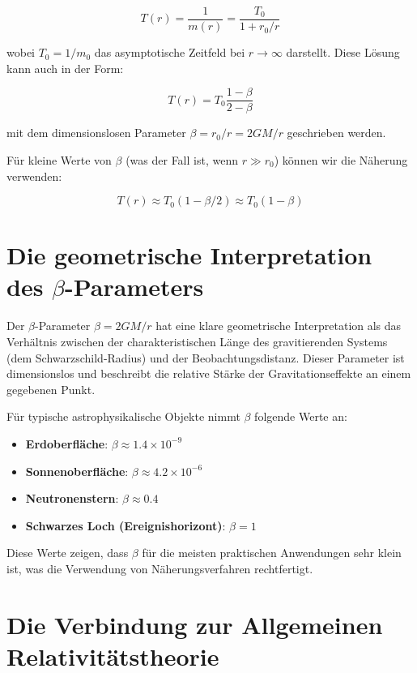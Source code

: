 \documentclass[12pt,a4paper]{report}
\begin{document}
	\begin{equation}
		T(r) = \frac{1}{m(r)} = \frac{T_0}{1 + r_0/r}
	\end{equation}
	
	wobei $T_0 = 1/m_0$ das asymptotische Zeitfeld bei $r \to \infty$ darstellt. Diese Lösung kann auch in der Form:
	
	\begin{equation}
		T(r) = T_0\frac{1 - \beta}{2 - \beta}
	\end{equation}
	
	mit dem dimensionslosen Parameter $\beta = r_0/r = 2GM/r$ geschrieben werden.
	
	Für kleine Werte von $\beta$ (was der Fall ist, wenn $r \gg r_0$) können wir die Näherung verwenden:
	
	\begin{equation}
		T(r) \approx T_0(1 - \beta/2) \approx T_0(1 - \beta)
	\end{equation}
	
	\section{Die geometrische Interpretation des $\beta$-Parameters}
	
	Der $\beta$-Parameter $\beta = 2GM/r$ hat eine klare geometrische Interpretation als das Verhältnis zwischen der charakteristischen Länge des gravitierenden Systems (dem Schwarzschild-Radius) und der Beobachtungsdistanz. Dieser Parameter ist dimensionslos und beschreibt die relative Stärke der Gravitationseffekte an einem gegebenen Punkt.
	
	Für typische astrophysikalische Objekte nimmt $\beta$ folgende Werte an:
	
	\begin{itemize}
		\item \textbf{Erdoberfläche}: $\beta \approx 1.4 \times 10^{-9}$
		\item \textbf{Sonnenoberfläche}: $\beta \approx 4.2 \times 10^{-6}$
		\item \textbf{Neutronenstern}: $\beta \approx 0.4$
		\item \textbf{Schwarzes Loch (Ereignishorizont)}: $\beta = 1$
	\end{itemize}
	
	Diese Werte zeigen, dass $\beta$ für die meisten praktischen Anwendungen sehr klein ist, was die Verwendung von Näherungsverfahren rechtfertigt.
	
	\section{Die Verbindung zur Allgemeinen Relativitätstheorie}
	
\end{document}
